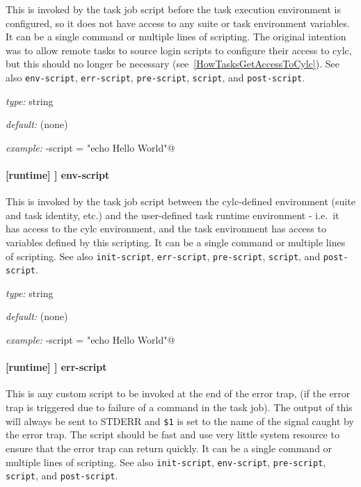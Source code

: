This is invoked by the task job script before the task execution
environment is configured, so it does not have access to any suite or task
environment variables. It can be a single command or multiple lines of
scripting. The original intention was to allow remote tasks to
source login scripts to configure their access to cylc, but this should no
longer be necessary (see~\ref{HowTasksGetAccessToCylc}). See also
\lstinline=env-script=, \lstinline=err-script=, \lstinline=pre-script=,
\lstinline=script=, and \lstinline=post-script=.

\begin{myitemize}
\item {\em type:} string
\item {\em default:} (none)
\item {\em example:} \lstinline@init-script = "echo Hello World"@
\end{myitemize}

\paragraph[env-script]{[runtime] \textrightarrow [[\_\_NAME\_\_]] \textrightarrow env-script}

This is invoked by the task job script between the cylc-defined environment
(suite and task identity, etc.) and the user-defined task runtime environment -
i.e.\ it has access to the cylc environment, and the task environment has
access to variables defined by this scripting. It can be a single command or
multiple lines of scripting.  See also \lstinline=init-script=,
\lstinline=err-script=, \lstinline=pre-script=, \lstinline=script=, and
\lstinline=post-script=.

\begin{myitemize}
\item {\em type:} string
\item {\em default:} (none)
\item {\em example:} \lstinline@env-script = "echo Hello World"@
\end{myitemize}

\paragraph[err-script]{[runtime] \textrightarrow [[\_\_NAME\_\_]] \textrightarrow err-script}

This is any custom script to be invoked at the end of the error trap, (if the
error trap is triggered due to failure of a command in the task job). The
output of this will always be sent to STDERR and \lstinline=$1= is set to the
name of the signal caught by the error trap. The script should be fast and use
very little system resource to ensure that the error trap can return quickly.
It can be a single command or multiple lines of scripting. See also
\lstinline=init-script=, \lstinline=env-script=, \lstinline=pre-script=,
\lstinline=script=, and \lstinline=post-script=.

